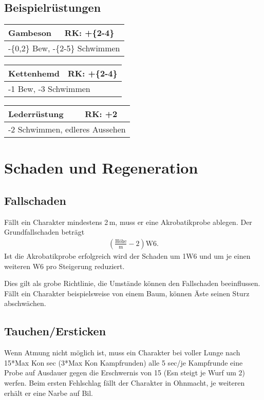 \documentclass[../../Heldenanleitung2]{subfiles}
\begin{document}
\subsection{Beispielrüstungen}
\begin{multicols}{2}
\begin{tabular}{|p{}|p{}|}
\hline
\textbf{Gambeson} & RK: +\{2-4\}\\
\hline
\multicolumn{2}{|p{0.4\textwidth}|}{-\{0,2\} Bew, -\{2-5\} Schwimmen} \\
\hline
\end{tabular} 


\begin{tabular}{|p{}|p{}|}
\hline
\textbf{Kettenhemd} & RK: +\{2-4\}\\
\hline
\multicolumn{2}{|p{0.4\textwidth}|}{-1 Bew, -3 Schwimmen} \\
\hline
\end{tabular}

\begin{tabular}{|p{}|p{}|}
\hline
\textbf{Lederrüstung} & RK: +2\\
\hline
\multicolumn{2}{|p{0.4\textwidth}|}{-2 Schwimmen, edleres Aussehen} \\
\hline
\end{tabular}
\end{multicols}

\section{Schaden und Regeneration}

\subsection{Fallschaden}
Fällt ein Charakter mindestens 2\,m, muss er eine Akrobatikprobe ablegen. Der Grundfallschaden beträgt
\begin{align*}
	\left(\frac{\text{Höhe}}{\text{m}}-2\right)\text{W}6.
\end{align*}
Ist die Akrobatikprobe erfolgreich wird der Schaden um 1W6 und um je einen weiteren W6 pro Steigerung reduziert.

Dies gilt als grobe Richtlinie, die Umstände können den Fallschaden beeinflussen. Fällt ein Charakter beispielsweise von einem Baum, können Äste seinen Sturz abschwächen.

\subsection{Tauchen/Ersticken}
Wenn Atmung nicht möglich ist, muss ein Charakter bei voller Lunge nach 15*Max Kon sec (3*Max Kon Kampfrunden) alle 5 sec/je Kampfrunde eine Probe auf Ausdauer gegen die Erschwernis von 15 (Esn steigt je Wurf um 2) werfen. Beim ersten Fehlschlag fällt der Charakter in Ohnmacht, je weiteren erhält er eine Narbe auf Bil.
\end{document}
